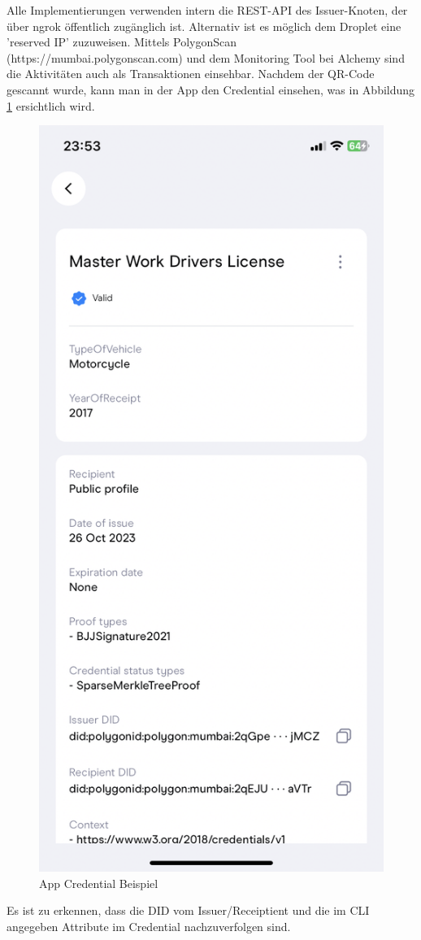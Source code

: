 \begin{itemize}
	Alle Implementierungen verwenden intern die REST-API des Issuer-Knoten, der über ngrok öffentlich zugänglich ist. Alternativ ist es möglich dem Droplet eine 'reserved IP' zuzuweisen. Mittels PolygonScan (https://mumbai.polygonscan.com) und dem Monitoring Tool bei Alchemy sind die Aktivitäten auch als Transaktionen einsehbar. Nachdem der QR-Code gescannt wurde, kann man in der App den Credential einsehen, was in Abbildung \ref{fig:appCredential} ersichtlich wird.
	 \begin{figure}[t]
	 	\centering
	 	\includegraphics[scale=0.2]{media/appCredential}
	 	\caption{App Credential Beispiel}
	 	\label{fig:appCredential}
	 \end{figure}
	 
	 Es ist zu erkennen, dass die DID vom Issuer/Receiptient und die im CLI angegeben Attribute im Credential nachzuverfolgen sind.
	\end{itemize}
	 
